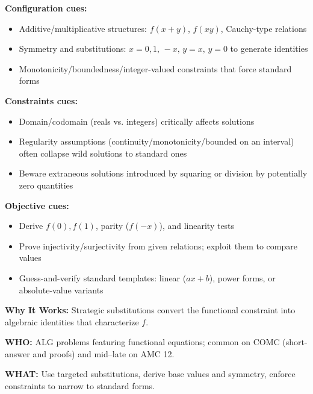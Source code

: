 \documentclass[12pt]{article}
\begin{document}
\textbf{Configuration cues:}
\begin{itemize}
    \item Additive/multiplicative structures: $f(x+y)$, $f(xy)$, Cauchy-type relations
    \item Symmetry and substitutions: $x=0,1,\,-x,\,y=x,\,y=0$ to generate identities
    \item Monotonicity/boundedness/integer-valued constraints that force standard forms
\end{itemize}

\textbf{Constraints cues:}
\begin{itemize}
    \item Domain/codomain (reals vs. integers) critically affects solutions
    \item Regularity assumptions (continuity/monotonicity/bounded on an interval) often collapse wild solutions to standard ones
    \item Beware extraneous solutions introduced by squaring or division by potentially zero quantities
\end{itemize}

\textbf{Objective cues:}
\begin{itemize}
    \item Derive $f(0), f(1)$, parity ($f(-x)$), and linearity tests
    \item Prove injectivity/surjectivity from given relations; exploit them to compare values
    \item Guess-and-verify standard templates: linear ($ax+b$), power forms, or absolute-value variants
\end{itemize}

\textbf{Why It Works:} Strategic substitutions convert the functional constraint into algebraic identities that characterize $f$.

\textbf{WHO:} ALG problems featuring functional equations; common on COMC (short-answer and proofs) and mid–late on AMC 12.

\textbf{WHAT:} Use targeted substitutions, derive base values and symmetry, enforce constraints to narrow to standard forms.
\end{document}
